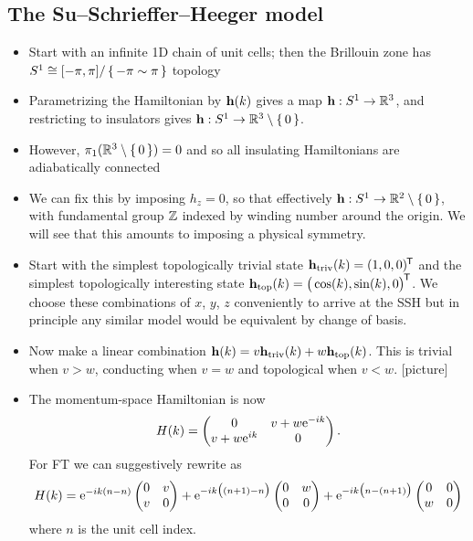 \subsection{The Su--Schrieffer--Heeger model}
{\color{blue}
\begin{itemize}
	\item Start with an infinite 1D chain of unit cells; then the Brillouin zone has $S^1\cong [-\pi,\pi]/\set{-\pi\sim\pi}$ topology
	
	\item Parametrizing the Hamiltonian by $\vb{h}(k)$ gives a map $\vb{h}:S^1\to\mathbb{R}^3$, and restricting to insulators gives $\vb{h}:S^1\to\mathbb{R}^3\setminus\set{0}$.
	
	\item However, $\pi_1(\mathbb{R}^3\setminus\set{0}) = 0$ and so all insulating Hamiltonians are adiabatically connected
	
	\item We can fix this by imposing $h_z = 0$, so that effectively $\vb{h}:S^1\to\mathbb{R}^2\setminus\set{0}$, with fundamental group $\mathbb{Z}$ indexed by winding number around the origin. We will see that this amounts to imposing a physical symmetry.
	
	\item Start with the simplest topologically trivial state $\vb{h}_{\rm triv}(k) = (1, 0, 0)^{\mkern-1.5mu\mathsf{T}}$ and the simplest topologically interesting state $\vb{h}_{\rm top}(k) = \big(\cos(k), \sin(k), 0\big)^{\mkern-1.5mu\mathsf{T}}$. We choose these combinations of $x$, $y$, $z$ conveniently to arrive at the SSH but in principle any similar model would be equivalent by change of basis.
	
	\item Now make a linear combination $\vb{h}(k) = v\vb{h}_{\rm triv}(k) + w\vb{h}_{\rm top}(k)$. This is trivial when $v>w$, conducting when $v=w$ and topological when $v<w$. [picture]
	
	\item The momentum-space Hamiltonian is now
	\[
		H(k) = \begin{pmatrix}
			0 & v + w{\rm e}^{-ik} \\
			v + w{\rm e}^{ik} & 0
		\end{pmatrix}.
	\]
	For FT we can suggestively rewrite as
	\[
		H(k) = {\rm e}^{-ik(n-n)}\begin{pmatrix}
			0 & v \\
			v & 0
		\end{pmatrix} + {\rm e}^{-ik\big((n+1)-n\big)}\begin{pmatrix}
		0 & w \\
		0 & 0
		\end{pmatrix} + {\rm e}^{-ik\big(n-(n+1)\big)}\begin{pmatrix}
		0 & 0 \\
		w & 0
		\end{pmatrix}
	\]
	where $n$ is the unit cell index.
	

\end{itemize}}
